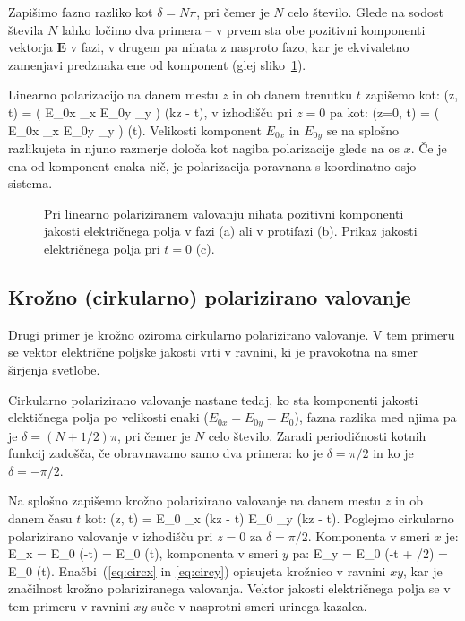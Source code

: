 Zapišimo fazno razliko kot $\delta = N\pi$, pri čemer je $N$ celo število. 
Glede na sodost števila $N$ lahko ločimo dva primera -- v prvem sta obe pozitivni komponenti
vektorja $\mathbf{E}$ v fazi, v drugem pa nihata z nasproto fazo, kar je ekvivaletno 
zamenjavi predznaka ene od komponent (glej sliko~\ref{fig:03_linpol}). 

Linearno polarizacijo na danem mestu $z$ in ob danem trenutku $t$ zapišemo
kot:
\beq
{} (z, t) = \left( E_{0x} _x \pm E_{0y} _y \right)
\cos \left(kz - \omega t\right)\!,
\label{eq:03_38}
\eeq
v izhodišču pri $z=0$ pa kot:
\beq
{} (z=0, t) = \left( E_{0x} _x \pm E_{0y} _y \right)
\cos \left(\omega t\right)\!.
\label{eq:03_39}
\eeq
Velikosti komponent $E_{0x}$ in $E_{0y}$ se na splošno razlikujeta in njuno razmerje
določa kot nagiba polarizacije glede na os $x$. Če je ena od komponent enaka nič, je 
polarizacija poravnana s koordinatno osjo sistema.

\begin{figure}[ht]
\centering
\def\svgwidth{140truemm} 

\caption{Pri linearno polariziranem valovanju nihata pozitivni komponenti jakosti
električnega polja v fazi (a) ali v protifazi (b). Prikaz jakosti električnega polja
pri $t=0$ (c).}
\label{fig:03_linpol}
\end{figure}

\subsection*{Krožno (cirkularno) polarizirano valovanje}
Drugi primer je krožno oziroma cirkularno polarizirano valovanje. V tem primeru
se vektor električne poljske jakosti vrti v ravnini, ki je pravokotna na smer 
širjenja svetlobe. 

Cirkularno polarizirano valovanje nastane tedaj, ko sta komponenti jakosti 
elektičnega polja po velikosti enaki ($E_{0x} = E_{0y} = E_0$), fazna razlika 
med njima pa je $\delta = (N+1/2) \pi$, pri čemer je $N$ celo število. 
Zaradi periodičnosti kotnih funkcij zadošča, 
če obravnavamo samo dva primera: ko je $\delta = \pi/2$ in ko je 
$\delta = - \pi/2$. 

Na splošno zapišemo krožno polarizirano valovanje
na danem mestu $z$ in ob danem času $t$ kot:
\beq
{} (z, t) = E_{0} _x \cos \left(kz - \omega t\right)
\pm E_{0} _y \sin \left(kz - \omega t\right)\!.
\label{eq:03_40}
\eeq
Poglejmo cirkularno polarizirano valovanje v izhodišču pri $z=0$ za 
$\delta = \pi/2$. Komponenta v smeri $x$ je:
\beq
E_x = E_0 \cos (-\omega t) = E_0 \cos (\omega t),
\label{eq:circx}
\eeq
komponenta v smeri $y$ pa:
\beq
E_y = E_0 \cos (-\omega t + \pi/2) = E_0 \sin (\omega t).
\label{eq:circy}
\eeq
Enačbi~(\ref{eq:circx} in \ref{eq:circy}) opisujeta krožnico v ravnini $xy$, 
kar je značilnost krožno polariziranega valovanja. Vektor jakosti
električnega polja se v tem primeru v ravnini $xy$ suče v nasprotni 
smeri urinega kazalca.

